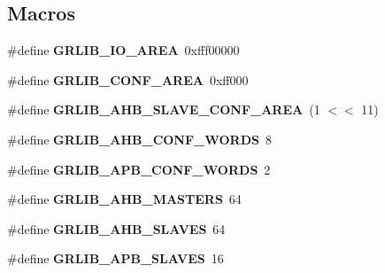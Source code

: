 \subsection*{Macros}
\begin{DoxyCompactItemize}
\item 
\mbox{\label{group__RTEMSBSPsRISCVGRLIBAMBA_ga23ba69eef39ac8857a4fbe37301286be}} 
\#define {\bfseries G\+R\+L\+I\+B\+\_\+\+I\+O\+\_\+\+A\+R\+EA}~0xfff00000
\item 
\mbox{\label{group__RTEMSBSPsRISCVGRLIBAMBA_gadb9d112a0b8fd779458ecedad4356859}} 
\#define {\bfseries G\+R\+L\+I\+B\+\_\+\+C\+O\+N\+F\+\_\+\+A\+R\+EA}~0xff000
\item 
\mbox{\label{group__RTEMSBSPsRISCVGRLIBAMBA_gac86531ede005d4b7192eac3e73551025}} 
\#define {\bfseries G\+R\+L\+I\+B\+\_\+\+A\+H\+B\+\_\+\+S\+L\+A\+V\+E\+\_\+\+C\+O\+N\+F\+\_\+\+A\+R\+EA}~(1 $<$$<$ 11)
\item 
\mbox{\label{group__RTEMSBSPsRISCVGRLIBAMBA_gace606356aabc9408320eb9f60d23aece}} 
\#define {\bfseries G\+R\+L\+I\+B\+\_\+\+A\+H\+B\+\_\+\+C\+O\+N\+F\+\_\+\+W\+O\+R\+DS}~8
\item 
\mbox{\label{group__RTEMSBSPsRISCVGRLIBAMBA_gaa19895659637dae0851711ea448e254d}} 
\#define {\bfseries G\+R\+L\+I\+B\+\_\+\+A\+P\+B\+\_\+\+C\+O\+N\+F\+\_\+\+W\+O\+R\+DS}~2
\item 
\mbox{\label{group__RTEMSBSPsRISCVGRLIBAMBA_ga2ae54166d2e4300cc6030b478b51aa11}} 
\#define {\bfseries G\+R\+L\+I\+B\+\_\+\+A\+H\+B\+\_\+\+M\+A\+S\+T\+E\+RS}~64
\item 
\mbox{\label{group__RTEMSBSPsRISCVGRLIBAMBA_ga038737a270cfdf8439cd68434274bc75}} 
\#define {\bfseries G\+R\+L\+I\+B\+\_\+\+A\+H\+B\+\_\+\+S\+L\+A\+V\+ES}~64
\item 
\mbox{\label{group__RTEMSBSPsRISCVGRLIBAMBA_gaa9a21362044739c281bb81d2f09949c0}} 
\#define {\bfseries G\+R\+L\+I\+B\+\_\+\+A\+P\+B\+\_\+\+S\+L\+A\+V\+ES}~16
\item 
$$
\end{DoxyCompactItemize}
